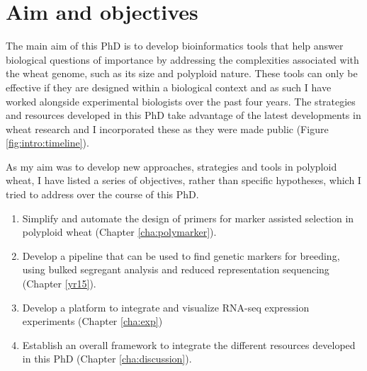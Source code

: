 





\section{Aim and objectives}


The main aim of this PhD is to develop bioinformatics tools that help answer biological questions of importance by addressing the complexities associated with the wheat genome, such as its size and polyploid nature. These tools can only be effective if they are designed within a biological context and as such I have worked alongside experimental biologists over the past four years. The strategies and resources developed in this PhD take advantage of the latest developments in wheat research and I incorporated these as they were made public (Figure \ref{fig:intro:timeline}).  



As my aim was to develop new approaches, strategies and tools in polyploid wheat, I have listed a series of objectives, rather than specific hypotheses, which I tried to address over the course of this PhD. 


\begin{enumerate}

\item Simplify and automate the design of primers for marker assisted selection in polyploid wheat (Chapter \ref{cha:polymarker}).
\item Develop a pipeline that can be used to find genetic markers for breeding, using bulked segregant analysis and reduced representation sequencing  (Chapter \ref{yr15}).
\item Develop a platform to integrate and visualize RNA-seq expression experiments (Chapter \ref{cha:exp})
\item Establish an overall framework to integrate the different resources developed in this PhD (Chapter \ref{cha:discussion}).
\end{enumerate}

